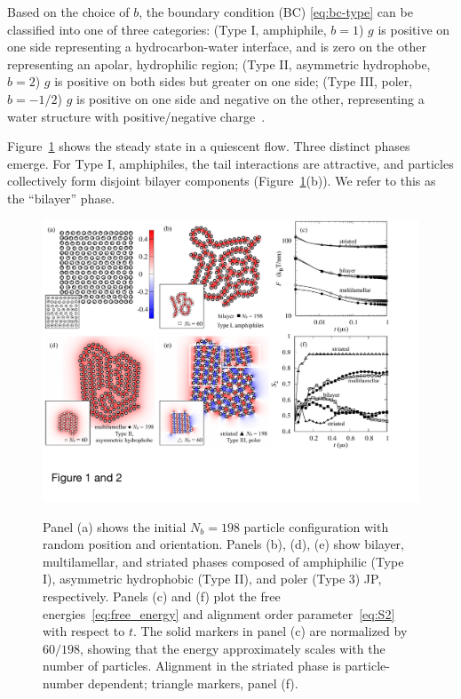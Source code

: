 \documentclass[prb,preprint,showpacs,preprintnumbers,amsmath,amssymb,longbibliography]{revtex4-1}
\begin{document}
Based on the choice of $b$,
the boundary condition (BC) \eqref{eq:bc-type}
can be classified into one of three categories:
(Type I, amphiphile, $b = 1$) $g$ is positive on 
one side representing a hydrocarbon-water interface, and
is zero on the other representing an apolar, hydrophilic region;
(Type II, asymmetric hydrophobe, $b = 2$) $g$ is positive
on both sides but greater on one side;
(Type III, poler, $b = -1/2$) $g$ is positive on one
side and negative on the other, representing a
water structure with positive/negative charge~\cite{MaRa76, Ma77}.

Figure~\ref{fig:relax} shows the steady state in a quiescent flow.
Three distinct phases emerge. For Type I, amphiphiles,
the tail interactions are attractive, and particles collectively
form disjoint bilayer components (Figure~\ref{fig:relax}(b)).
We refer to this as the ``bilayer'' phase.

\begin{figure}[t!]
\begin{center}
  \includegraphics[width=\textwidth]{Figures/Figure1and2.pdf}
\end{center}
\begin{caption}{\label{fig:relax}
  Panel (a) shows the initial $N_b = 198$ particle configuration with random
  position and orientation.
  Panels (b), (d), (e) show bilayer, multilamellar, and striated phases
  composed of amphiphilic (Type I), asymmetric hydrophobic (Type II),
  and poler (Type 3) JP, respectively. 
  Panels (c) and (f) plot the free energies~\eqref{eq:free_energy}
  and alignment order parameter~\eqref{eq:S2} with respect
  to $t$. The solid markers in panel (c) are 
  normalized by $60/198$, showing that the energy
  approximately scales with the number of particles.
  Alignment in the striated phase is particle-number dependent; 
  triangle markers, panel (f).}  
\end{caption}
\end{figure}
\end{document}
